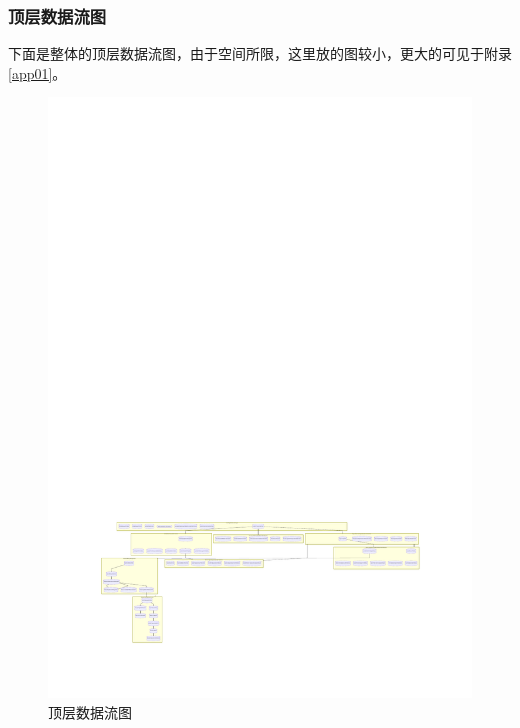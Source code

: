 \subsubsection{顶层数据流图}
下面是整体的顶层数据流图，由于空间所限，这里放的图较小，更大的可见于附录\ref{app01}。
\begin{figure}[htbp]
	\centering
	\includegraphics[width=\textwidth]{figures/01.pdf}
	\caption{顶层数据流图}
\end{figure}

